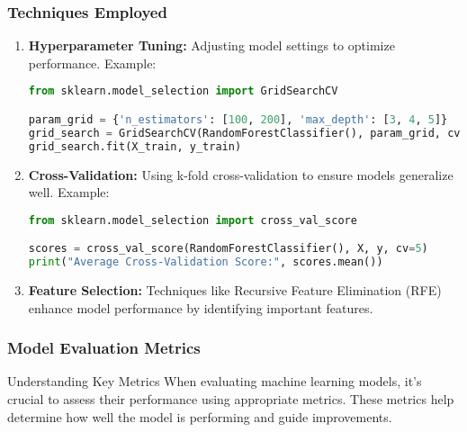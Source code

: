 \documentclass[aspectratio=169]{beamer}
\begin{document}
\begin{frame}[fragile]
    \frametitle{Techniques Employed}
    \begin{enumerate}
        \item \textbf{Hyperparameter Tuning:}
        Adjusting model settings to optimize performance. Example:
        \begin{lstlisting}[language=Python]
from sklearn.model_selection import GridSearchCV

param_grid = {'n_estimators': [100, 200], 'max_depth': [3, 4, 5]}
grid_search = GridSearchCV(RandomForestClassifier(), param_grid, cv=5)
grid_search.fit(X_train, y_train)
        \end{lstlisting}
    
        \item \textbf{Cross-Validation:}
        Using k-fold cross-validation to ensure models generalize well. Example:
        \begin{lstlisting}[language=Python]
from sklearn.model_selection import cross_val_score

scores = cross_val_score(RandomForestClassifier(), X, y, cv=5)
print("Average Cross-Validation Score:", scores.mean())
        \end{lstlisting}

        \item \textbf{Feature Selection:}
        Techniques like Recursive Feature Elimination (RFE) enhance model performance by identifying important features.
    \end{enumerate}
\end{frame}

\begin{frame}[fragile]
    \frametitle{Model Evaluation Metrics}
    \begin{block}{Understanding Key Metrics}
        When evaluating machine learning models, it’s crucial to assess their performance using appropriate metrics. 
        These metrics help determine how well the model is performing and guide improvements.
    \end{block}
\end{frame}
\end{document}
